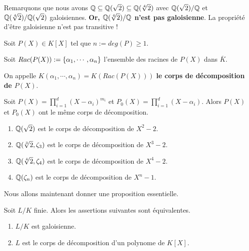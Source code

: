 Remarquons que nous avons $\mathbb{Q} \subseteq \mathbb{Q}(\sqrt{2}) \subseteq
\mathbb{Q}(\sqrt[4]{2})$ avec $\mathbb{Q}(\sqrt{2})/\mathbb{Q}$ et
$\mathbb{Q}(\sqrt[4]{2})/\mathbb{Q}(\sqrt{2})$ galoisiennes.
\textbf{Or, $\mathbb{Q}(\sqrt[4]{2})/\mathbb{Q}$ n'est pas galoisienne}. La
propriété d'être galoisienne n'est pas transitive !

\begin{definition}
	Soit $P(X) \in K[X]$ tel que $n := deg(P) \geq 1$.

	Soit $Rac(P(X)) := \left\{ \alpha_{1}, \cdots, \alpha_{n} \right\}$ l'ensemble des
	racines de $P(X)$ dans $\overline{K}$.

	On appelle $K(\alpha_{1}, \cdots, \alpha_{n}) = K(Rac(P(X)))$ \textbf{le
	corps de décomposition de $P(X)$}.
\end{definition}

\begin{remarque}
	Soit $P(X) = \displaystyle \prod_{i = 1}^{d} (X - \alpha_{i})^{m_{i}}$ et
	$P_{0}(X) = \displaystyle \prod_{i = 1}^{d} (X - \alpha_{i})$. Alors $P(X)$
	et $P_{0}(X)$ ont le même corps de décomposition.
\end{remarque}

\begin{exemple}
	\begin{enumerate}
		\item $\mathbb{Q}(\sqrt{2})$ est le corps de décomposition de $X^{2} -
			2$.
		\item $\mathbb{Q}(\sqrt[3]{2}, \zeta_{3})$ est le corps de décomposition
			de $X^{3} - 2$.
		\item $\mathbb{Q}(\sqrt[4]{2}, \zeta_{4})$ est le corps de décomposition
			de $X^{4} - 2$.
		\item $\mathbb{Q}(\zeta_{n})$ est le corps de décomposition de $X^{n} -
			1$.
	\end{enumerate}
\end{exemple}

Nous allons maintenant donner une proposition essentielle.

\begin{proposition}
	Soit $L/K$ finie. Alors les assertions suivantes sont équivalentes.
	\begin{enumerate}
		\item $L/K$ est galoisienne.
		\item $L$ est le corps de décomposition d'un polynome de $K[X]$.
	\end{enumerate}
\end{proposition}

